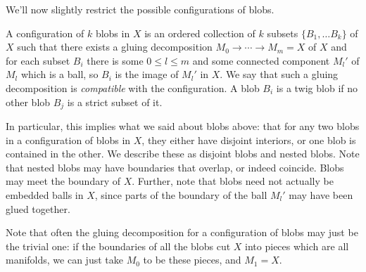 We'll now slightly restrict the possible configurations of blobs.
\begin{defn}
\label{defn:configuration}
A configuration of $k$ blobs in $X$ is an ordered collection of $k$ subsets $\{B_1, \ldots B_k\}$ 
of $X$ such that there exists a gluing decomposition $M_0  \to \cdots \to M_m = X$ of $X$ and 
for each subset $B_i$ there is some $0 \leq l \leq m$ and some connected component $M_l'$ of 
$M_l$ which is a ball, so $B_i$ is the image of $M_l'$ in $X$. 
We say that such a gluing decomposition 
is \emph{compatible} with the configuration. 
A blob $B_i$ is a twig blob if no other blob $B_j$ is a strict subset of it. 
\end{defn}
In particular, this implies what we said about blobs above: 
that for any two blobs in a configuration of blobs in $X$, 
they either have disjoint interiors, or one blob is contained in the other. 
We describe these as disjoint blobs and nested blobs. 
Note that nested blobs may have boundaries that overlap, or indeed coincide. 
Blobs may meet the boundary of $X$.
Further, note that blobs need not actually be embedded balls in $X$, since parts of the 
boundary of the ball $M_l'$ may have been glued together.

Note that often the gluing decomposition for a configuration of blobs may just be the trivial one: 
if the boundaries of all the blobs cut $X$ into pieces which are all manifolds, 
we can just take $M_0$ to be these pieces, and $M_1 = X$.

